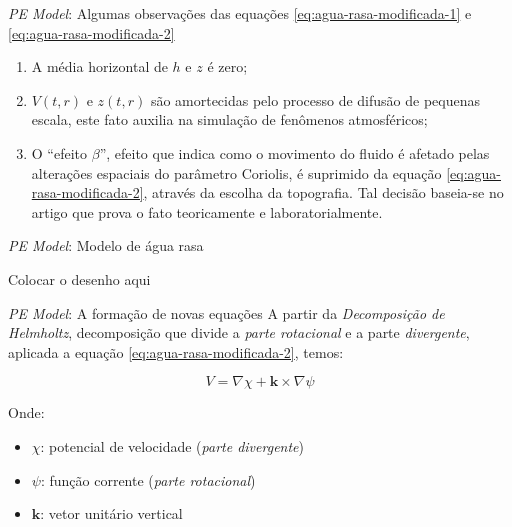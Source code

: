 \begin{frame}{\textit{PE Model}: Algumas observações das equações \eqref{eq:agua-rasa-modificada-1} e \eqref{eq:agua-rasa-modificada-2}}
	\begin{enumerate}
		\item A média horizontal de $h$ e $z$ é zero;
		\item $V(t,r)$ e $z(t,r)$ são amortecidas pelo processo de difusão de pequenas escala, este fato auxilia na simulação de fenômenos atmosféricos;
		\item O ``efeito $\beta$'', efeito que indica como o movimento do fluido é afetado pelas alterações espaciais do parâmetro Coriolis, é suprimido da equação \eqref{eq:agua-rasa-modificada-2}, através da escolha da topografia. Tal decisão baseia-se no artigo \cite{von_arx1952} que prova o fato teoricamente e laboratorialmente. 
	\end{enumerate}
\end{frame}


\begin{frame}{\textit{PE Model}: Modelo de água rasa}
    \begin{center}
        Colocar o desenho aqui
    \end{center}
\end{frame}


\begin{frame}{\textit{PE Model}: A formação de novas equações}
	A partir da \textit{Decomposição de Helmholtz}, decomposição que divide a \textit{parte rotacional} e a parte \textit{divergente}, aplicada a equação \eqref{eq:agua-rasa-modificada-2}, temos:
	
	\begin{equation}
		V = \nabla\chi + \mathbf{k} \times \nabla \psi \label{eq:decomposicao-helmholtz}
	\end{equation}
	
	Onde:
	\begin{itemize}
		\item $\chi$: potencial de velocidade (\textit{parte divergente})
		\item $\psi$: função corrente (\textit{parte rotacional})
		\item $\mathbf{k}$: vetor unitário vertical
	\end{itemize}
\end{frame}



